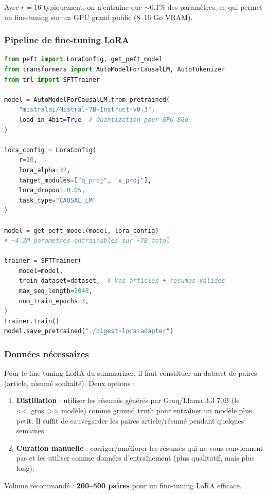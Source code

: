 \documentclass[11pt, a4paper]{article}
\begin{document}
Avec $r = 16$ typiquement, on n'entraîne que $\sim$0.1\% des paramètres, ce qui permet un fine-tuning sur un GPU grand public (8--16 Go VRAM).

\subsubsection{Pipeline de fine-tuning LoRA}

\begin{lstlisting}[language=Python, caption={Fine-tuning LoRA avec PEFT}]
from peft import LoraConfig, get_peft_model
from transformers import AutoModelForCausalLM, AutoTokenizer
from trl import SFTTrainer

model = AutoModelForCausalLM.from_pretrained(
    "mistralai/Mistral-7B-Instruct-v0.3",
    load_in_4bit=True  # Quantization pour GPU 8Go
)

lora_config = LoraConfig(
    r=16,
    lora_alpha=32,
    target_modules=["q_proj", "v_proj"],
    lora_dropout=0.05,
    task_type="CAUSAL_LM"
)

model = get_peft_model(model, lora_config)
# ~4.2M parametres entrainables sur ~7B total

trainer = SFTTrainer(
    model=model,
    train_dataset=dataset,  # Vos articles + resumes valides
    max_seq_length=2048,
    num_train_epochs=3,
)
trainer.train()
model.save_pretrained("./digest-lora-adapter")
\end{lstlisting}

\subsubsection{Données nécessaires}

Pour le fine-tuning LoRA du summarizer, il faut constituer un dataset de paires (article, résumé souhaité). Deux options :

\begin{enumerate}
    \item \textbf{Distillation} : utiliser les résumés générés par Groq/Llama 3.3 70B (le <<~gros~>> modèle) comme ground truth pour entraîner un modèle plus petit. Il suffit de sauvegarder les paires article/résumé pendant quelques semaines.
    \item \textbf{Curation manuelle} : corriger/améliorer les résumés qui ne vous conviennent pas et les utiliser comme données d'entraînement (plus qualitatif, mais plus long).
\end{enumerate}

Volume recommandé : \textbf{200--500 paires} pour un fine-tuning LoRA efficace.
\end{document}
